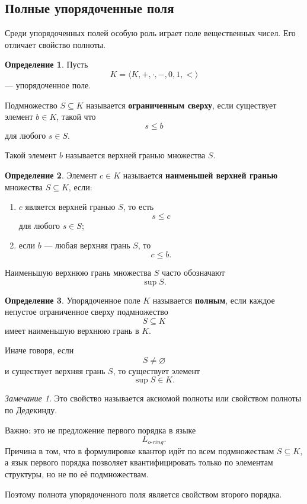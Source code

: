 \documentclass[12pt,a4paper,oneside,openany]{book}
\theoremstyle{definition}
\newtheorem{definition}{Определение}[chapter]
\theoremstyle{plain}
\theoremstyle{remark}
\newtheorem{remark}{Замечание}[chapter]
\begin{document}
\subsection{Полные упорядоченные поля}

Среди упорядоченных полей особую роль играет поле вещественных чисел. Его отличает свойство полноты.

\begin{definition}
Пусть
\[
K=\langle K,+,\cdot,-,0,1,<\rangle
\]
— упорядоченное поле.

Подмножество $S\subseteq K$ называется \textbf{ограниченным сверху}, если существует элемент $b\in K$, такой что
\[
s\le b
\]
для любого $s\in S$.

Такой элемент $b$ называется верхней гранью множества $S$.
\end{definition}

\begin{definition}
Элемент $c\in K$ называется \textbf{наименьшей верхней гранью} множества $S\subseteq K$, если:
\begin{enumerate}
    \item $c$ является верхней гранью $S$, то есть
    \[
    s\le c
    \]
    для любого $s\in S$;
    \item если $b$ — любая верхняя грань $S$, то
    \[
    c\le b.
    \]
\end{enumerate}
\end{definition}

Наименьшую верхнюю грань множества $S$ часто обозначают
\[
\sup S.
\]

\begin{definition}
Упорядоченное поле $K$ называется \textbf{полным}, если каждое непустое ограниченное сверху подмножество
\[
S\subseteq K
\]
имеет наименьшую верхнюю грань в $K$.
\end{definition}

Иначе говоря, если
\[
S\ne\varnothing
\]
и существует верхняя грань $S$, то существует элемент
\[
\sup S\in K.
\]

\begin{remark}
Это свойство называется аксиомой полноты или свойством полноты по Дедекинду.

Важно: это не предложение первого порядка в языке
\[
L_{o\text{-}ring}.
\]
Причина в том, что в формулировке квантор идёт по всем подмножествам $S\subseteq K$, а язык первого порядка позволяет квантифицировать только по элементам структуры, но не по её подмножествам.

Поэтому полнота упорядоченного поля является свойством второго порядка.
\end{remark}
\end{document}
